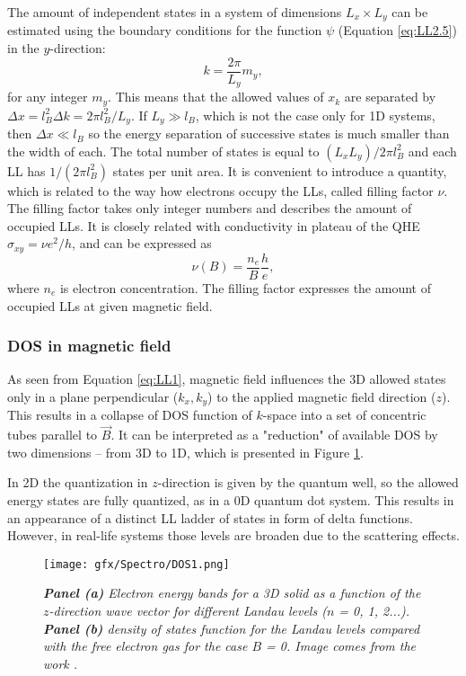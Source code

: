 \documentclass[titlepage,a4paper]{book}
\newcommand{\wciecie}{\quad\phantom{v}}
\begin{document}
The amount of independent states in a system of dimensions $L_x \times L_y$ can be estimated using the boundary conditions for the function $\psi$ (Equation \ref{eq:LL2.5}) in the $y$-direction:
\begin{equation}
\label{eq:LL5}
k = \frac{2\pi}{L_y}m_y,
\end{equation}
for any integer $m_y$. This means that the allowed values of $x_k$ are separated by $\Delta x = l_B^2 \Delta k = 2\pi l_B^2/L_y$. If $L_y \gg l_B$, which is not the case only for 1D systems, then $\Delta x \ll l_B$ so the energy separation of successive states is much smaller than the width of each. The total number of states is equal to $(L_x L_y)/2\pi l_B^2$ and each LL has $1/(2\pi l_B^2)$ states per unit area. It is convenient to introduce a quantity, which is related to the way how electrons occupy the LLs, called filling factor $\nu$. The filling factor takes only integer numbers and describes the amount of occupied LLs. It is closely related with conductivity in plateau of the QHE $\sigma_{xy} = \nu e^2/h$, and can be expressed as
\begin{equation}
\label{eq:FillingFactor}
\nu (B) = \frac{n_e}{B}\frac{h}{e},
\end{equation}
where $n_e$ is electron concentration. The filling factor expresses the amount of occupied LLs at given magnetic field.


\subsubsection{DOS in magnetic field}
\wciecie
As seen from Equation \ref{eq:LL1}, magnetic field influences the 3D allowed states only in a plane perpendicular ($k_x,k_y$) to the applied magnetic field direction ($z$). This results in a collapse of DOS function of $k$-space into a set of concentric tubes parallel to $\vec{B}$. It can be interpreted as a "reduction" of available DOS by two dimensions -- from 3D to 1D, which is presented in Figure \ref{fig:DOS1}. 

In 2D the quantization in $z$-direction is given by the quantum well, so the allowed energy states are fully quantized, as in a 0D quantum dot system. This results in an appearance of a distinct LL ladder of states in form of delta functions. However, in real-life systems those levels are broaden due to the scattering effects.
\begin{figure}[H]
	\centering
	\texttt{[image: gfx/Spectro/DOS1.png]}
	\vspace{-10pt}
	\caption{\textit{\textbf{Panel (a)} Electron energy bands for a 3D solid as a function of the $z$-direction wave vector for different Landau levels ($n$ = 0, 1, 2...). \textbf{Panel (b)} density of states function for the Landau levels compared with the free electron gas for the case $B$ = 0. Image comes from the work \cite{Martinez_Nanotechnology}.}}
	\label{fig:DOS1}
\end{figure}
\end{document}
